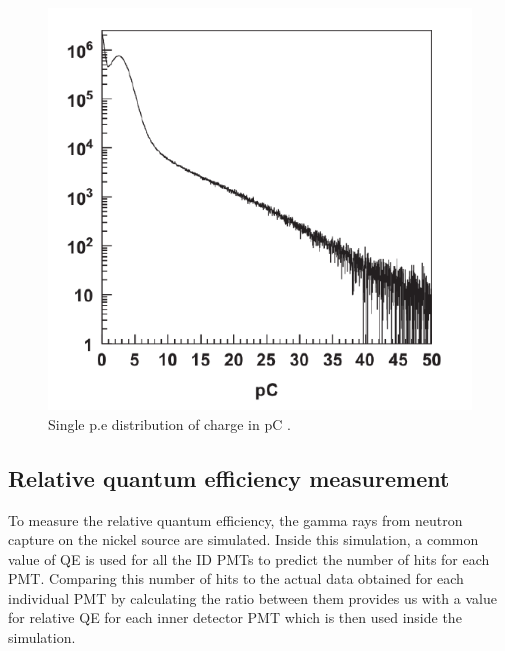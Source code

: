 \begin{figure}
\centering
    \includegraphics[width=.7\textwidth]{Figures/singlepe.png}
\caption[Single p.e distribution of charge in pC.]{Single p.e distribution of charge in pC \cite{abe_calibration_2014}.}
    \label{fig:singlepe}
\end{figure}
    

\subsection{Relative quantum efficiency measurement}

To measure the relative quantum efficiency, the gamma rays from neutron capture on the nickel source are simulated. Inside this simulation, a common value of QE is used for all the ID PMTs to predict the number of hits for each PMT. Comparing this number of hits to the actual data obtained for each individual PMT by calculating the ratio between them provides us with a value for relative QE for each inner detector PMT which is then used inside the simulation. 

